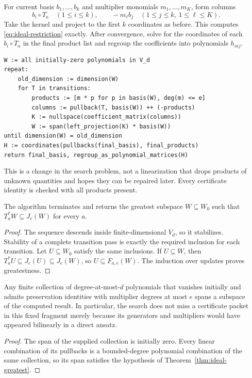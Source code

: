 For current basis $b_1,\ldots,b_k$ and multiplier monomials
$m_1,\ldots,m_K$, form columns
\[
 b_i\circ T_a\quad(1\le i\le k),
 \qquad -m_\ell b_j\quad(1\le j\le k,\ 1\le\ell\le K).
\]
Take the kernel and project to the first $k$ coordinates as before. This
computes \eqref{eq:ideal-restriction} exactly. After convergence, solve for the
coordinates of each $b_i\circ T_a$ in the final product list and regroup the
coefficients into polynomials $h_{aij}$.

\begin{lstlisting}
W := all initially-zero polynomials in V_d
repeat:
    old_dimension := dimension(W)
    for T in transitions:
        products := [m * p for p in basis(W), deg(m) <= e]
        columns := pullback(T, basis(W)) ++ (-products)
        K := nullspace(coefficient_matrix(columns))
        W := span(left_projection(K) * basis(W))
until dimension(W) = old_dimension
H := coordinates(pullbacks(final_basis), final_products)
return final_basis, regroup_as_polynomial_matrices(H)
\end{lstlisting}

This is a change in the search problem, not a linearization that drops products
of unknown quantities and hopes they can be repaired later. Every certificate
identity is checked with all products present.

\begin{theorem}
\label{thm:ideal-greatest}
The algorithm terminates and returns the greatest subspace $W\subseteq W_0$
such that $T_a^*W\subseteq J_e(W)$ for every $a$.
\end{theorem}
\begin{proof}
The sequence descends inside finite-dimensional $V_d$, so it stabilizes.
Stability of a complete transition pass is exactly the required inclusion for
each transition. Let $U\subseteq W_0$ satisfy the same inclusions. If
$U\subseteq W$, then
$T_a^*U\subseteq J_e(U)\subseteq J_e(W)$, so
$U\subseteq F_{a,e}(W)$. The induction over updates proves greatestness.
\end{proof}

\begin{corollary}
Any finite collection of degree-at-most-$d$ polynomials that vanishes initially
and admits preservation identities with multiplier degrees at most $e$ spans a
subspace of the computed result. In particular, the search does not miss a
certificate packet in this fixed fragment merely because its generators and
multipliers would have appeared bilinearly in a direct ansatz.
\end{corollary}
\begin{proof}
The span of the supplied collection is initially zero. Every linear combination
of its pullbacks is a bounded-degree polynomial combination of the same
collection, so its span satisfies the hypothesis of
Theorem~\ref{thm:ideal-greatest}.
\end{proof}

